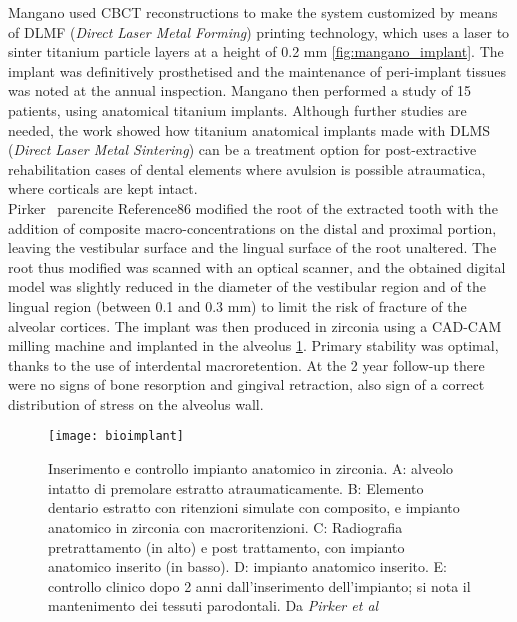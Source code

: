Mangano \parencite{Reference84} used CBCT reconstructions to make the system customized by means of DLMF (\emph{Direct Laser Metal Forming}) printing technology, which uses a laser to sinter titanium particle layers at a height of 0.2 mm \ref{fig:mangano_implant}. The implant was definitively prosthetised and the maintenance of peri-implant tissues was noted at the annual inspection.
Mangano \parencite{Reference85} then performed a study of 15 patients, using anatomical titanium implants. Although further studies are needed, the work showed how titanium anatomical implants made with DLMS (\emph{Direct Laser Metal Sintering}) can be a treatment option for post-extractive rehabilitation cases of dental elements where avulsion is possible atraumatica, where corticals are kept intact. \\
Pirker \ parencite {Reference86} modified the root of the extracted tooth with the addition of composite macro-concentrations on the distal and proximal portion, leaving the vestibular surface and the lingual surface of the root unaltered. The root thus modified was scanned with an optical scanner, and the obtained digital model was slightly reduced in the diameter of the vestibular region and of the lingual region (between 0.1 and 0.3 mm) to limit the risk of fracture of the alveolar cortices. The implant was then produced in zirconia using a CAD-CAM milling machine and implanted in the alveolus \ref{fig:bioimplant}. Primary stability was optimal, thanks to the use of interdental macroretention. At the 2 year follow-up there were no signs of bone resorption and gingival retraction, also sign of a correct distribution of stress on the alveolus wall.
\begin{figure}[h]
\vspace{-10pt}
	\begin{center}
	\texttt{[image: bioimplant]}
    \caption{Inserimento e controllo impianto anatomico in zirconia. A: alveolo intatto di premolare estratto atraumaticamente. B: Elemento dentario estratto con ritenzioni simulate con composito, e impianto anatomico in zirconia con macroritenzioni. C: Radiografia pretrattamento (in alto) e post trattamento, con impianto anatomico inserito (in basso). D: impianto anatomico inserito. E: controllo clinico dopo 2 anni dall'inserimento dell'impianto; si nota il mantenimento dei tessuti parodontali. Da \emph{Pirker et al} \parencite{Reference86}}
    \label{fig:bioimplant}
    \end{center}
\vspace{-10pt}
\end{figure}


